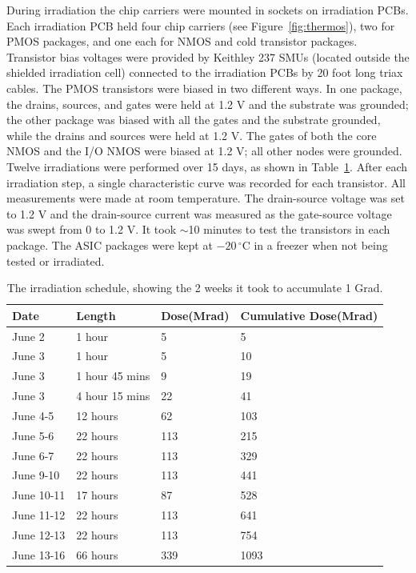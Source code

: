 During irradiation the chip carriers were mounted in sockets on irradiation PCBs.  Each irradiation PCB held four chip carriers (see Figure~\ref{fig:thermos}), two for PMOS packages, and one each for NMOS and cold transistor packages.  Transistor bias voltages were provided by Keithley 237 SMUs (located outside the shielded irradiation cell) connected to the irradiation PCBs by 20 foot long triax cables. The PMOS transistors were biased in two different ways.  In one package, the drains, sources, and gates were held at 1.2 V and the substrate was grounded; the other package was biased with all the gates and the substrate grounded, while the drains and sources were held at 1.2 V.  The gates of both the core NMOS and the I/O NMOS were biased at 1.2 V; all other nodes were grounded.  Twelve irradiations were performed over 15 days, as shown in Table~\ref{tab:Irradiation_Schedule}.  After each irradiation step, a single characteristic curve was recorded for each transistor.  All measurements were made at room temperature. The drain-source voltage was set to 1.2 V and the drain-source current was measured
as the gate-source voltage was swept from 0 to 1.2 V.  It took $\sim$10 minutes to test the transistors in each package.  The ASIC packages were kept at $-20\,^{\circ}$C in a freezer when not being tested or irradiated.

\begin{table}
\begin{center}
\caption{The irradiation schedule, showing the 2 weeks it took to accumulate 1 Grad.}
\begin{tabular}{| p{2cm} | p{2.5cm} | p{2cm} | p{4cm} |}
\hline
Date & Length & Dose(Mrad) & Cumulative Dose(Mrad)\\ \hline
June 2 & 1 hour & 5 & 5\\ \hline
June 3 & 1 hour & 5 & 10 \\ \hline
June 3 & 1 hour 45 mins & 9 & 19 \\ \hline
June 3 & 4 hour 15 mins & 22 & 41 \\ \hline
June 4-5 & 12 hours & 62 & 103 \\ \hline
June 5-6 & 22 hours & 113 & 215 \\ \hline
June 6-7 & 22 hours & 113 & 329 \\ \hline
June 9-10 & 22 hours & 113 & 441 \\ \hline
June 10-11 & 17 hours & 87 & 528 \\ \hline
June 11-12 & 22 hours & 113 & 641 \\ \hline
June 12-13 & 22 hours & 113 & 754 \\ \hline
June 13-16 & 66 hours & 339 & 1093 \\
\hline
\end{tabular}
\label{tab:Irradiation_Schedule}
\end{center}
\end{table}

